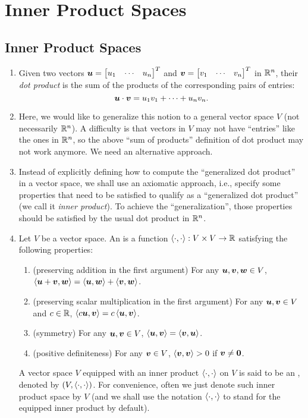 \section{Inner Product Spaces}
\label{sect:inner-product}
\subsection{Inner Product Spaces}
\begin{enumerate}
\item Given two vectors \(\vect{u}=\mqty[u_1&\cdots&u_n]^{T}\) and
\(\vect{v}=\mqty[v_1&\cdots&v_n]^{T}\) in \(\mathbb{R}^n\), their \emph{dot product} is
the sum of the products of the corresponding pairs of entries:
\[
\vb*{u}\cdot\vb*{v}=u_1v_1+\dotsb+u_nv_n.
\]
\item Here, we would like to generalize this notion to a general vector space
\(V\) (not necessarily \(\mathbb{R}^n\)). A difficulty is that vectors in \(V\) may not
have ``entries'' like the ones in \(\mathbb{R}^n\), so the above ``sum of products''
definition of dot product may not work anymore. We need an alternative approach.

\item Instead of explicitly defining how to compute the ``generalized dot
product'' in a vector space, we shall use an axiomatic approach, i.e., specify
some properties that need to be satisfied to qualify as a ``generalized dot
product'' (we call it \emph{inner product}). To achieve the ``generalization'',
those properties should be satisfied by the usual dot product in \(\mathbb{R}^n\).

\item Let \(V\) be a vector space. An  is a
function \(\left\langle \cdot,\cdot\right\rangle:V\times V\to\mathbb{R}\) satisfying the
following properties:
\begin{enumerate}[label={(\arabic*)}]
\item (preserving addition in the first argument) For any \(\vb*{u},\vb*{v},\vb*{w}\in V\),
\(\left\langle \vb*{u}+\vb*{v},\vb*{w}\right\rangle=\left\langle \vb*{u},\vb*{w}\right\rangle+\left\langle \vb*{v},\vb*{w}\right\rangle\).
\item (preserving scalar multiplication in the first argument) For any
\(\vb*{u},\vb*{v}\in V\) and \(c\in\mathbb{R}\),
\(\left\langle c\vb*{u},\vb*{v}\right\rangle=c\left\langle \vb*{u},\vb*{v}\right\rangle\).
\item (symmetry) For any \(\vb*{u},\vb*{v}\in V\),
\(\left\langle \vb*{u},\vb*{v}\right\rangle=\left\langle \vb*{v},\vb*{u}\right\rangle\).
\item (positive definiteness) For any \(\vb*{v}\in V\),
\(\left\langle \vb*{v},\vb*{v}\right\rangle>0\) if \(\vb*{v}\ne\vb*{0}\).
\end{enumerate}
A vector space \(V\) equipped with an inner product \(\left\langle \cdot,\cdot\right\rangle\) on
\(V\) is said to be an , denoted by
\((V,\left\langle \cdot,\cdot\right\rangle)\). For convenience, often we just denote such inner
product space by \(V\) (and we shall use the notation \(\left\langle \cdot,\cdot\right\rangle \)
to stand for the equipped inner product by default).


\end{enumerate}
